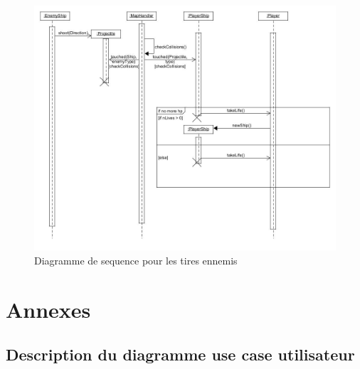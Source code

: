 \documentclass[a4paper,12pt]{article}
\begin{document}
\begin{figure}[hbtp]
\centering
\includegraphics[scale=0.3]{enemy_shooting}
\caption{Diagramme de sequence pour les tires ennemis }
\end{figure}

\newpage
\section{Annexes}
\subsection{ Description du diagramme use case utilisateur}
\end{document}
